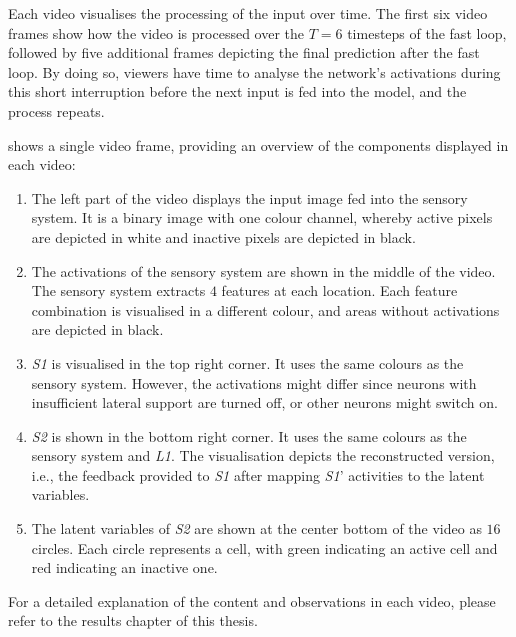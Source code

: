 Each video visualises the processing of the input over time.
The first six video frames show how the video is processed over the $T=6$ timesteps of the fast loop, followed by five additional frames depicting the final prediction after the fast loop.
By doing so, viewers have time to analyse the network's activations during this short interruption before the next input is fed into the model, and the process repeats.

 shows a single video frame, providing an overview of the components displayed in each video:
\begin{enumerate}
    \item The left part of the video displays the input image fed into the sensory system. It is a binary image with one colour channel, whereby active pixels are depicted in white and inactive pixels are depicted in black.
    \item The activations of the sensory system are shown in the middle of the video. The sensory system extracts $4$ features at each location. Each feature combination is visualised in a different colour, and areas without activations are depicted in black.
    \item \emph{S1} is visualised in the top right corner. It uses the same colours as the sensory system. However, the activations might differ since neurons with insufficient lateral support are turned off, or other neurons might switch on.
    \item \emph{S2} is shown in the bottom right corner. It uses the same colours as the sensory system and \emph{L1}. The visualisation depicts the reconstructed version, i.e., the feedback provided to \emph{S1} after mapping \emph{S1}' activities to the latent variables.
    \item The latent variables of \emph{S2} are shown at the center bottom of the video as $16$ circles. Each circle represents a cell, with green indicating an active cell and red indicating an inactive one. 
\end{enumerate}

For a detailed explanation of the content and observations in each video, please refer to the results chapter of this thesis.

